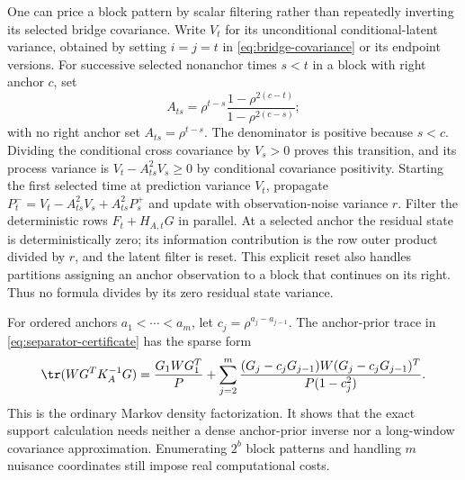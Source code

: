 One can price a block pattern by scalar filtering rather than repeatedly
inverting its selected bridge covariance. Write $V_t$ for its unconditional
conditional-latent variance, obtained by setting $i=j=t$ in
\eqref{eq:bridge-covariance} or its endpoint versions. For successive selected
nonanchor times $s<t$ in a block with right anchor $c$, set
\begin{equation}\label{eq:bridge-transition}
 A_{ts}=\rho^{t-s}\frac{1-\rho^{2(c-t)}}{1-\rho^{2(c-s)}};
\end{equation}
with no right anchor set $A_{ts}=\rho^{t-s}$. The denominator is positive
because $s<c$. Dividing the conditional cross covariance by $V_s>0$
proves this transition, and its process variance is
$V_t-A_{ts}^2V_s\ge0$ by conditional covariance positivity. Starting the
first selected time at prediction variance $V_t$, propagate
$P_t^-=V_t-A_{ts}^2V_s+A_{ts}^2P_s^+$ and update with observation-noise
variance $r$. Filter the deterministic rows $F_t+H_{A,t}G$ in parallel.
At a selected anchor the residual state is deterministically zero; its
information contribution is the row outer product divided by $r$, and the
latent filter is reset. This explicit reset also handles partitions assigning
an anchor observation to a block that continues on its right. Thus no formula
divides by its zero residual state variance.

For ordered anchors $a_1<\cdots<a_m$, let
$c_j=\rho^{a_j-a_{j-1}}$. The anchor-prior trace in
\eqref{eq:separator-certificate} has the sparse form
\begin{equation}\label{eq:anchor-prior-score}
 \tr(WG^TK_A^{-1}G)=\frac{G_1WG_1^T}{P}
 +\sum_{j=2}^m
 \frac{(G_j-c_jG_{j-1})W(G_j-c_jG_{j-1})^T}{P(1-c_j^2)}.
\end{equation}
This is the ordinary Markov density factorization. It shows that the exact
support calculation needs neither a dense anchor-prior inverse nor a
long-window covariance approximation. Enumerating $2^b$ block patterns and
handling $m$ nuisance coordinates still impose real computational costs.
